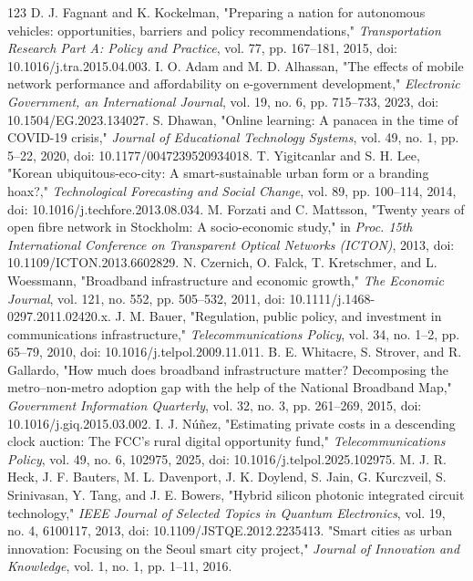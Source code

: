 \documentclass[journal]{IEEEtran}
\begin{document}
\begin{thebibliography}{123}
 D. J. Fagnant and K. Kockelman, "Preparing a nation for autonomous vehicles: opportunities, barriers and policy recommendations," \emph{Transportation Research Part A: Policy and Practice}, vol. 77, pp. 167--181, 2015, doi: 10.1016/j.tra.2015.04.003.
 I. O. Adam and M. D. Alhassan, "The effects of mobile network performance and affordability on e-government development," \emph{Electronic Government, an International Journal}, vol. 19, no. 6, pp. 715--733, 2023, doi: 10.1504/EG.2023.134027.
 S. Dhawan, "Online learning: A panacea in the time of COVID-19 crisis," \emph{Journal of Educational Technology Systems}, vol. 49, no. 1, pp. 5--22, 2020, doi: 10.1177/0047239520934018.
 T. Yigitcanlar and S. H. Lee, "Korean ubiquitous-eco-city: A smart-sustainable urban form or a branding hoax?," \emph{Technological Forecasting and Social Change}, vol. 89, pp. 100--114, 2014, doi: 10.1016/j.techfore.2013.08.034.
 M. Forzati and C. Mattsson, "Twenty years of open fibre network in Stockholm: A socio-economic study," in \emph{Proc. 15th International Conference on Transparent Optical Networks (ICTON)}, 2013, doi: 10.1109/ICTON.2013.6602829.
 N. Czernich, O. Falck, T. Kretschmer, and L. Woessmann, "Broadband infrastructure and economic growth," \emph{The Economic Journal}, vol. 121, no. 552, pp. 505--532, 2011, doi: 10.1111/j.1468-0297.2011.02420.x.
 J. M. Bauer, "Regulation, public policy, and investment in communications infrastructure," \emph{Telecommunications Policy}, vol. 34, no. 1--2, pp. 65--79, 2010, doi: 10.1016/j.telpol.2009.11.011.
 B. E. Whitacre, S. Strover, and R. Gallardo, "How much does broadband infrastructure matter? Decomposing the metro--non-metro adoption gap with the help of the National Broadband Map," \emph{Government Information Quarterly}, vol. 32, no. 3, pp. 261--269, 2015, doi: 10.1016/j.giq.2015.03.002.
 I. J. N\'u\~nez, "Estimating private costs in a descending clock auction: The FCC's rural digital opportunity fund," \emph{Telecommunications Policy}, vol. 49, no. 6, 102975, 2025, doi: 10.1016/j.telpol.2025.102975.
 M. J. R. Heck, J. F. Bauters, M. L. Davenport, J. K. Doylend, S. Jain, G. Kurczveil, S. Srinivasan, Y. Tang, and J. E. Bowers, "Hybrid silicon photonic integrated circuit technology," \emph{IEEE Journal of Selected Topics in Quantum Electronics}, vol. 19, no. 4, 6100117, 2013, doi: 10.1109/JSTQE.2012.2235413.
 "Smart cities as urban innovation: Focusing on the Seoul smart city project," \emph{Journal of Innovation and Knowledge}, vol. 1, no. 1, pp. 1--11, 2016.

\end{thebibliography}
\end{document}
